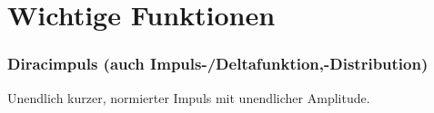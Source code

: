 



\section{Wichtige Funktionen}

\small

\subsubsection*{Diracimpuls \tiny (auch Impuls-/Deltafunktion,-Distribution)}

{\footnotesize
Unendlich kurzer, normierter Impuls mit unendlicher Amplitude. }

